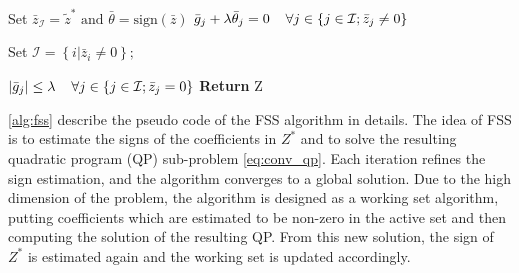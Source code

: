 \documentclass[../thesis.tex]{subfiles}
\begin{document}
\begin{algorithm}[ht]
\begin{algorithmic}[1]
				\STATE Set $\bar z_\mathcal I = \widetilde z^* \text{ and } \bar \theta = \text{sign}(\bar z)$
			\UNTIL $\bar g_j + \lambda \bar\theta_j = 0 \hspace{.4cm}\forall j \in \left\{j \in \mathcal I; \bar z_j \neq 0\right\}$

			\STATE Set $\mathcal I = \left\{ i | \bar z_i \neq 0\right\};$

		\UNTIL $|\bar g_j| \le \lambda  \hspace{.4cm}\forall j \in \left\{j \in \mathcal I; \bar z_j = 0\right\}$
		\STATE\textbf{Return } Z
	\end{algorithmic}
\end{algorithm}

	\autoref{alg:fss} describe the pseudo code of the FSS algorithm in details. The
	idea of FSS is to estimate the signs of the coefficients in $Z^*$ and to solve
	the resulting quadratic program (QP) sub-problem \autoref{eq:conv_qp}. Each
	iteration refines the sign estimation, and the algorithm converges to a global solution.
	Due to the high dimension of the problem, the algorithm is designed as a working
	set algorithm, putting coefficients which are estimated to be non-zero in the
	active set and then computing the solution of the resulting QP. From this new
	solution, the sign of $Z^*$ is estimated again and the working set is updated
	accordingly.
\end{document}
